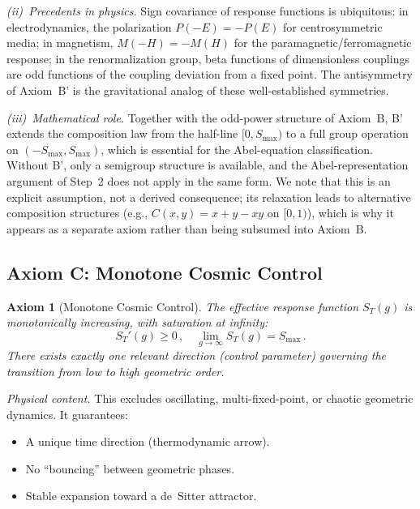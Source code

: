 \documentclass[aps,prd,twocolumn,superscriptaddress,nofootinbib]{revtex4-2}
\newtheorem{axiom}{Axiom}
\begin{document}
\textit{(ii)~Precedents in physics.} Sign covariance of response functions is ubiquitous: in electrodynamics, the polarization $P(-E) = -P(E)$ for centrosymmetric media; in magnetism, $M(-H) = -M(H)$ for the paramagnetic/ferromagnetic response; in the renormalization group, beta functions of dimensionless couplings are odd functions of the coupling deviation from a fixed point. The antisymmetry of Axiom~B' is the gravitational analog of these well-established symmetries.

\textit{(iii)~Mathematical role.} Together with the odd-power structure of Axiom~B, B' extends the composition law from the half-line $[0, S_{\max})$ to a full group operation on $(-S_{\max}, S_{\max})$, which is essential for the Abel-equation classification. Without B', only a semigroup structure is available, and the Abel-representation argument of Step~2 does not apply in the same form. We note that this is an explicit assumption, not a derived consequence; its relaxation leads to alternative composition structures (e.g., $C(x,y) = x + y - xy$ on $[0,1)$), which is why it appears as a separate axiom rather than being subsumed into Axiom~B.

\subsection{Axiom C: Monotone Cosmic Control}

\begin{axiom}[Monotone Cosmic Control]
\label{ax:monotone}
The effective response function $S_T(g)$ is monotonically increasing, with saturation at infinity:
\begin{equation}
S_T'(g) \geq 0\,, \quad \lim_{g \to \infty} S_T(g) = S_{\max}\,.
\label{eq:monotone}
\end{equation}
There exists exactly one relevant direction (control parameter) governing the transition from low to high geometric order.
\end{axiom}

\textit{Physical content.} This excludes oscillating, multi-fixed-point, or chaotic geometric dynamics. It guarantees:
\begin{itemize}
\item A unique time direction (thermodynamic arrow).
\item No ``bouncing'' between geometric phases.
\item Stable expansion toward a de~Sitter attractor.
\end{itemize}
\end{document}
